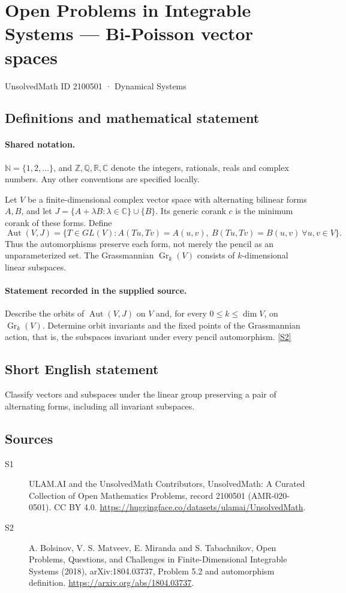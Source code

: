 \documentclass[11pt]{article}
\newcommand{\sref}[2]{\hyperlink{source:#1:#2}{[S#2]}}
\begin{document}
\setcounter{section}{2100500}
\section{Open Problems in Integrable Systems — Bi-Poisson vector spaces}\label{2100501}
{\small\sffamily UnsolvedMath ID 2100501 · Dynamical Systems}
\subsection{Definitions and mathematical statement}

\paragraph{Shared notation.}$\mathbb N=\{1,2,\ldots\}$, and $\mathbb Z,\mathbb Q,\mathbb R,\mathbb C$ denote the integers, rationals, reals and complex numbers. Any other conventions are specified locally.


Let $V$ be a finite-dimensional complex vector space with alternating bilinear forms $A,B$, and let $J=\{A+\lambda B:\lambda\in\mathbb C\}\cup\{B\}$. Its generic corank $c$ is the minimum corank of these forms. Define \[\operatorname{Aut}(V,J)=\{T\in GL(V):A(Tu,Tv)=A(u,v),\ B(Tu,Tv)=B(u,v)\ \forall u,v\in V\}.\] Thus the automorphisms preserve each form, not merely the pencil as an unparameterized set. The Grassmannian $\operatorname{Gr}_k(V)$ consists of $k$-dimensional linear subspaces.
\paragraph{Statement recorded in the supplied source.}
Describe the orbits of $\operatorname{Aut}(V,J)$ on $V$ and, for every $0\le k\le\dim V$, on $\operatorname{Gr}_k(V)$. Determine orbit invariants and the fixed points of the Grassmannian action, that is, the subspaces invariant under every pencil automorphism. \sref{2100501}{2}
\subsection{Short English statement}
Classify vectors and subspaces under the linear group preserving a pair of alternating forms, including all invariant subspaces.
\subsection{Sources}
\begin{description}
\item[\hypertarget{source:2100501:1}{S1}] ULAM.AI and the UnsolvedMath Contributors, UnsolvedMath: A Curated Collection of Open Mathematics Problems, record 2100501 (AMR-020-0501). CC BY 4.0. \url{https://huggingface.co/datasets/ulamai/UnsolvedMath}.
\item[\hypertarget{source:2100501:2}{S2}] A. Bolsinov, V. S. Matveev, E. Miranda and S. Tabachnikov, Open Problems, Questions, and Challenges in Finite-Dimensional Integrable Systems (2018), arXiv:1804.03737, Problem 5.2 and automorphism definition. \url{https://arxiv.org/abs/1804.03737}.
\end{description}
\label{end:2100501}
\end{document}
